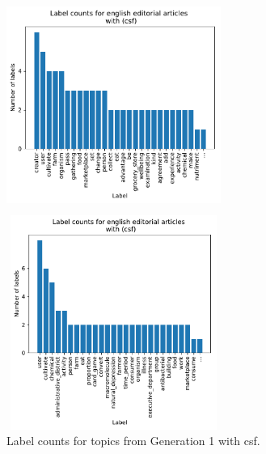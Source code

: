 {\begin{figure}[h]
	\begin{minipage}[t]{0.5\textwidth}
		\includegraphics[width=7cm, height=7cm]{gfx/ATL_sim/with_scoring_pre.pdf}
	\end{minipage}
	\begin{minipage}[t]{0.5\textwidth}
		\includegraphics[width=7cm, height=7cm]{gfx/ATL_sim/with_scoring.pdf}
	\end{minipage}
	\caption{Label counts for topics from Generation 1 with \ac{csf}.}
	\label{extr_csf_count}
\end{figure}

}
